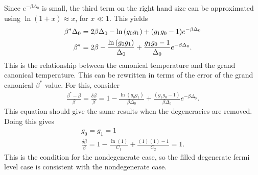 Since $e^{-\beta\Delta_0}$ is small, the third term on the right hand size can be approximated using $\ln(1+x)\approx x$, for $x\ll1$. This yields
\begin{align}
    \beta^*\Delta_0&=2\beta\Delta_0-\ln\qty(g_0g_1)+(g_1g_0-1)e^{-\beta\Delta_0}\nonumber\\
    \beta^*&=2\beta-\frac{\ln\qty(g_0g_1)}{\Delta_0}+\frac{g_1g_0-1}{\Delta_0}e^{-\beta\Delta_0}.
\end{align} 
This is the relationship between the canonical temperature and the grand canonical temperature. This can be rewritten in terms of the error of the grand canonical $\beta^*$ value. For this, consider 
\begin{align}
    \frac{\beta^*-\beta}{\beta}=\frac{\delta\beta}{\beta}=1-\frac{\ln(g_0g_1)}{\beta\Delta_0}+\frac{(g_1g_0 - 1)}{\beta \Delta_0}e^{-\beta\Delta_0}. \label{filldegen}
\end{align}
This equation should give the same results when the degeneracies are removed. Doing this gives
\begin{gather}
    g_0=g_1=1\nonumber\\
    \frac{\delta\beta}{\beta}=1-\frac{\ln(1)}{C_1}+\frac{(1)(1)-1}{C_2}=1. \label{filldegencheck}
\end{gather}
This is the condition for the nondegenerate case, so the filled degenerate fermi level case is consistent with the nondegenerate case. 

